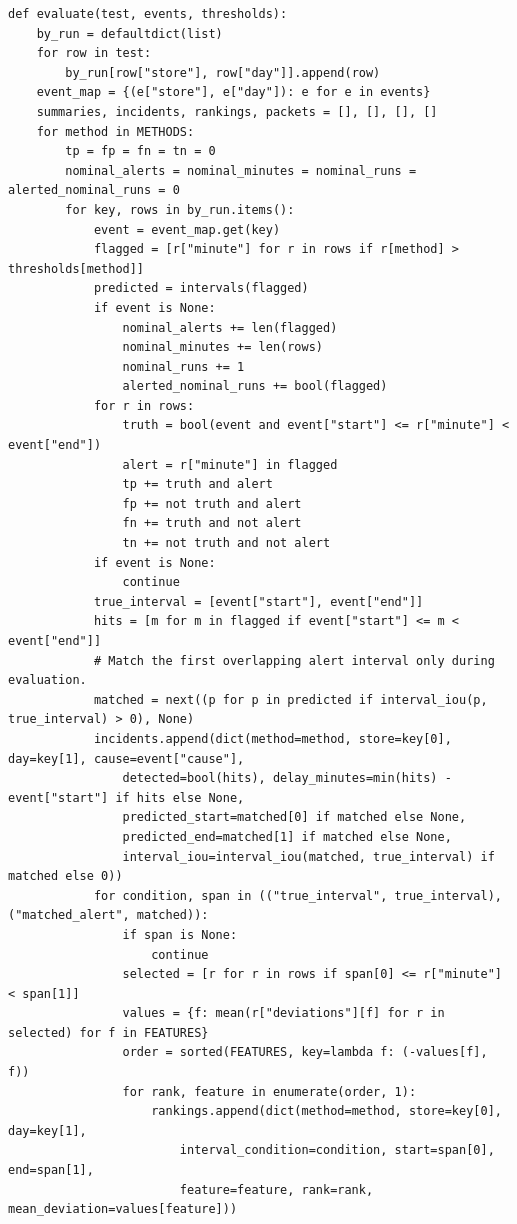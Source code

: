 \begin{Verbatim}[breaklines,breakanywhere,fontsize=\small]
def evaluate(test, events, thresholds):
    by_run = defaultdict(list)
    for row in test:
        by_run[row["store"], row["day"]].append(row)
    event_map = {(e["store"], e["day"]): e for e in events}
    summaries, incidents, rankings, packets = [], [], [], []
    for method in METHODS:
        tp = fp = fn = tn = 0
        nominal_alerts = nominal_minutes = nominal_runs = alerted_nominal_runs = 0
        for key, rows in by_run.items():
            event = event_map.get(key)
            flagged = [r["minute"] for r in rows if r[method] > thresholds[method]]
            predicted = intervals(flagged)
            if event is None:
                nominal_alerts += len(flagged)
                nominal_minutes += len(rows)
                nominal_runs += 1
                alerted_nominal_runs += bool(flagged)
            for r in rows:
                truth = bool(event and event["start"] <= r["minute"] < event["end"])
                alert = r["minute"] in flagged
                tp += truth and alert
                fp += not truth and alert
                fn += truth and not alert
                tn += not truth and not alert
            if event is None:
                continue
            true_interval = [event["start"], event["end"]]
            hits = [m for m in flagged if event["start"] <= m < event["end"]]
            # Match the first overlapping alert interval only during evaluation.
            matched = next((p for p in predicted if interval_iou(p, true_interval) > 0), None)
            incidents.append(dict(method=method, store=key[0], day=key[1], cause=event["cause"],
                detected=bool(hits), delay_minutes=min(hits) - event["start"] if hits else None,
                predicted_start=matched[0] if matched else None,
                predicted_end=matched[1] if matched else None,
                interval_iou=interval_iou(matched, true_interval) if matched else 0))
            for condition, span in (("true_interval", true_interval), ("matched_alert", matched)):
                if span is None:
                    continue
                selected = [r for r in rows if span[0] <= r["minute"] < span[1]]
                values = {f: mean(r["deviations"][f] for r in selected) for f in FEATURES}
                order = sorted(FEATURES, key=lambda f: (-values[f], f))
                for rank, feature in enumerate(order, 1):
                    rankings.append(dict(method=method, store=key[0], day=key[1],
                        interval_condition=condition, start=span[0], end=span[1],
                        feature=feature, rank=rank, mean_deviation=values[feature]))

\end{Verbatim}
